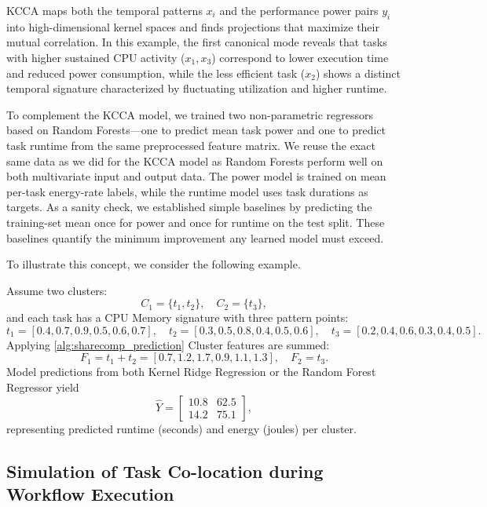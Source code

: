 KCCA maps both the temporal patterns \(x_i\)
and the performance power pairs \(y_i\)
into high-dimensional kernel spaces
and finds projections that maximize their mutual correlation.
In this example, the first canonical mode reveals that
tasks with higher sustained CPU activity
(\(x_1, x_3\))
correspond to lower execution time and reduced power consumption,
while the less efficient task (\(x_2\))
shows a distinct temporal signature characterized by
fluctuating utilization and higher runtime.


To complement the KCCA model, we trained two non-parametric regressors based on Random Forests—one to predict mean task power and one to predict task runtime from the same preprocessed feature matrix. We reuse the exact same data as we did for the KCCA model as Random Forests perform well on both multivariate input and output data. The power model is trained on mean per-task energy-rate labels, while the runtime model uses task durations as targets. As a sanity check, we established simple baselines by predicting the training-set mean once for power and once for runtime on the test split. These baselines quantify the minimum improvement any learned model must exceed.

To illustrate this concept, we consider the following example.

\label{sec:example_prediction_task_clusters}

Assume two clusters:
\[
    C_1 = \{t_1, t_2\}, \quad C_2 = \{t_3\},
\]
and each task has a CPU Memory signature with three pattern points:
\[
    t_1 = [0.4, 0.7, 0.9, 0.5, 0.6, 0.7], \quad
    t_2 = [0.3, 0.5, 0.8, 0.4, 0.5, 0.6], \quad
    t_3 = [0.2, 0.4, 0.6, 0.3, 0.4, 0.5].
\]
Applying \ref{alg:sharecomp_prediction} Cluster features are summed:
\[
    F_1 = t_1 + t_2 = [0.7, 1.2, 1.7, 0.9, 1.1, 1.3], \quad
    F_2 = t_3.
\]
Model predictions from both Kernel Ridge Regression or the Random Forest Regressor yield
\[
    \hat{Y} =
    \begin{bmatrix}
        10.8 & 62.5 \\
        14.2 & 75.1
    \end{bmatrix},
\]
representing predicted runtime (seconds) and energy (joules) per cluster.

\subsection{Simulation of Task Co-location during Workflow Execution}
\label{sec:simulation_environment}

